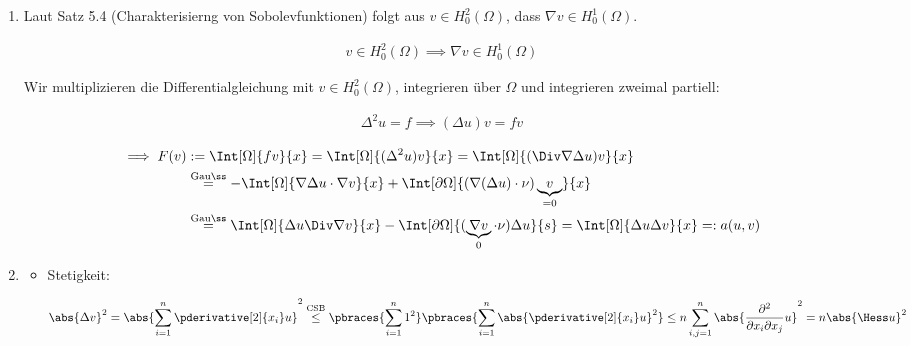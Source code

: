 \begin{solution}

\phantom{}

\begin{enumerate}[label = (\alph*)]

  \item Laut Satz 5.4 (Charakterisierng von Sobolevfunktionen) folgt aus $v \in H_0^2(\Omega)$, dass $\nabla v \in H_0^1(\Omega)$.

  \begin{align*}
    v \in H_0^2(\Omega)
    \implies
    \nabla v \in H_0^1(\Omega)
  \end{align*}

  Wir multiplizieren die Differentialgleichung mit $v \in H_0^2(\Omega)$, integrieren über $\Omega$ und integrieren zweimal partiell:

  \begin{align*}
    \Delta^2 u = f
    \implies
    (\Delta u) v = f v
  \end{align*}

  \begin{align*}
    \implies
    F(v)
    & :=
    \Int[\Omega]{f v}{x}
    =
    \Int[\Omega]{(\Delta^2 u) v}{x}
    =
    \Int[\Omega]{(\Div \nabla \Delta u) v}{x} \\
    & \stackrel
    {
      \mathrm{Gauß}
    }{=}
    -\Int[\Omega]{\nabla \Delta u \cdot \nabla v}{x}
    +
    \Int[\partial \Omega]{(\nabla (\Delta u) \cdot \nu) \underbrace{v}_{=0}}{x} \\
    & \stackrel
    {
      \mathrm{Gauß}
    }{=}
    \Int[\Omega]{\Delta u \Div \nabla v}{x}
    -
    \Int[\partial \Omega]{(\underbrace{\nabla v}_0 \cdot \nu) \Delta u}{s}
    =
    \Int[\Omega]{\Delta u \Delta v}{x}
    =:
    a(u, v)
  \end{align*}

  \item

  \begin{itemize}
    \item Stetigkeit:

    \begin{align*}
      \abs{\Delta v}^2
      =
      \abs
      {
        \sum_{i=1}^n
        \pderivative[2]{x_i} u
      }^2
      \stackrel
      {
        \mathrm{CSB}
      }{\leq}
      \pbraces
      {
        \sum_{i=1}^n
        1^2
      }
      \pbraces
      {
        \sum_{i=1}^n
        \abs{\pderivative[2]{x_i} u}^2
      }
      \leq
      n
      \sum_{i,j=1}^n
      \abs
      {
        \frac{\partial^2}{\partial x_i \partial x_j} u
      }^2
      =
      n \abs{\Hess u}^2
    \end{align*}


\end{itemize}
\end{enumerate}
\end{solution}
